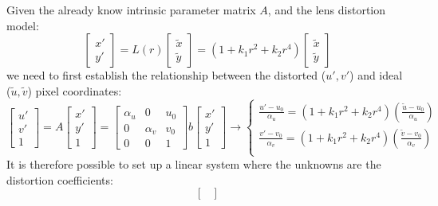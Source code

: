 \documentclass{article}
\begin{document}
\begin{enumerate}
        Given the already know intrinsic parameter matrix $A$, and the lens distortion model:
        \[
            \begin{bmatrix}
                x'\\
                y'
            \end{bmatrix} = L(r) \begin{bmatrix}
                \tilde{x}\\
                \tilde{y}
            \end{bmatrix} =(1 + k_1 r^2 + k_2 r^4) \begin{bmatrix}
                \tilde x\\
                \tilde y
            \end{bmatrix}
        \]
        we need to first establish the relationship between the distorted ($u',v'$) and ideal ($\tilde u,\tilde v$) pixel coordinates:
        \[
            \begin{bmatrix}
                u' \\ v' \\ 1
            \end{bmatrix} = A \begin{bmatrix}
                x' \\ y' \\ 1
            \end{bmatrix} = \begin{bmatrix}
                \alpha_u & 0 & u_0 \\
                0 & \alpha_v & v_0 \\
                0 & 0 & 1
            \end{bmatrix} b \begin{bmatrix}
                x' \\ y' \\ 1
            \end{bmatrix}
        \rightarrow \begin{cases}
            \displaystyle\frac{u' - u_0}{\alpha_u} = (1 + k_1 r^2 + k_2 r^4) \left(\displaystyle\frac{\tilde u - u_0}{\alpha_u} \right)\\
            \displaystyle\frac{v' - v_0}{\alpha_v} = (1 + k_1 r^2 + k_2 r^4) \left(\displaystyle\frac{\tilde v - v_0}{\alpha_v} \right)\\
        \end{cases}
    \]
    It is therefore possible to set up a linear system where the unknowns are the distortion coefficients: 
    \[
        \begin{bmatrix}

\end{bmatrix}\]
\end{enumerate}
\end{document}
